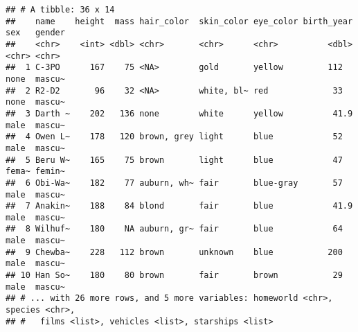 \documentclass[
]{book}
\newenvironment{Shaded}{\begin{snugshade}}{\end{snugshade}}
\newcommand{\AttributeTok}[1]{\textcolor[rgb]{0.77,0.63,0.00}{#1}}
\newcommand{\ControlFlowTok}[1]{\textcolor[rgb]{0.13,0.29,0.53}{\textbf{#1}}}
\newcommand{\DecValTok}[1]{\textcolor[rgb]{0.00,0.00,0.81}{#1}}
\newcommand{\FunctionTok}[1]{\textcolor[rgb]{0.00,0.00,0.00}{#1}}
\newcommand{\NormalTok}[1]{#1}
\newcommand{\OtherTok}[1]{\textcolor[rgb]{0.56,0.35,0.01}{#1}}
\newcommand{\SpecialCharTok}[1]{\textcolor[rgb]{0.00,0.00,0.00}{#1}}
\begin{document}
\begin{verbatim}
## # A tibble: 36 x 14
##    name    height  mass hair_color  skin_color eye_color birth_year sex   gender
##    <chr>    <int> <dbl> <chr>       <chr>      <chr>          <dbl> <chr> <chr> 
##  1 C-3PO      167    75 <NA>        gold       yellow         112   none  mascu~
##  2 R2-D2       96    32 <NA>        white, bl~ red             33   none  mascu~
##  3 Darth ~    202   136 none        white      yellow          41.9 male  mascu~
##  4 Owen L~    178   120 brown, grey light      blue            52   male  mascu~
##  5 Beru W~    165    75 brown       light      blue            47   fema~ femin~
##  6 Obi-Wa~    182    77 auburn, wh~ fair       blue-gray       57   male  mascu~
##  7 Anakin~    188    84 blond       fair       blue            41.9 male  mascu~
##  8 Wilhuf~    180    NA auburn, gr~ fair       blue            64   male  mascu~
##  9 Chewba~    228   112 brown       unknown    blue           200   male  mascu~
## 10 Han So~    180    80 brown       fair       brown           29   male  mascu~
## # ... with 26 more rows, and 5 more variables: homeworld <chr>, species <chr>,
## #   films <list>, vehicles <list>, starships <list>
\end{verbatim}

\begin{Shaded}
\end{Shaded}
\end{document}
